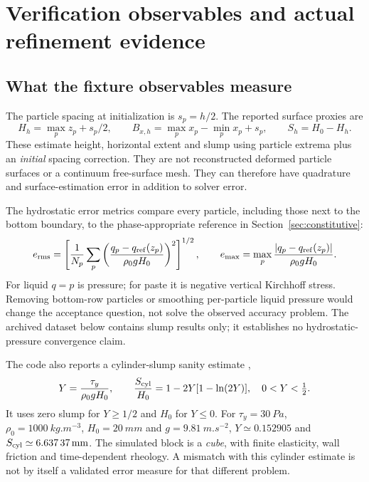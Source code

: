 \section{Verification observables and actual refinement evidence}
\label{sec:verification}
\subsection{What the fixture observables measure}
The particle spacing at initialization is $s_p=h/2$. The reported surface
proxies are
\begin{equation}
 H_h=\max_p z_p+s_p/2,\qquad
 B_{x,h}=\max_p x_p-\min_p x_p+s_p,\qquad S_h=H_0-H_h.
 \label{eq:surface-proxies}
\end{equation}
These estimate height, horizontal extent and slump using particle extrema plus
an \emph{initial} spacing correction. They are not reconstructed deformed
particle surfaces or a continuum free-surface mesh. They can therefore have
quadrature and surface-estimation error in addition to solver error.

The hydrostatic error metrics compare every particle, including those next to
the bottom boundary, to the phase-appropriate reference in
Section~\ref{sec:constitutive}:
\begin{equation}
 e_{\rm rms}=\left[\frac1{N_p}\sum_p
 \left(\frac{q_p-q_{\rm ref}(z_p)}{\rho_0gH_0}\right)^2\right]^{1/2},
 \qquad e_{\max}=\max_p\frac{|q_p-q_{\rm ref}(z_p)|}{\rho_0gH_0}.
\end{equation}
For liquid $q=p$ is pressure; for paste it is negative vertical Kirchhoff stress.
Removing bottom-row particles or smoothing per-particle liquid pressure would
change the acceptance question, not solve the observed accuracy problem.
The archived dataset below contains slump results only; it establishes no
hydrostatic-pressure convergence claim.

The code also reports a cylinder-slump sanity estimate \cite{pashias},
\begin{equation}
 Y=\frac{\tau_y}{\rho_0gH_0},\qquad
 \frac{S_{\rm cyl}}{H_0}=1-2Y[1-\ln(2Y)],\quad 0<Y<\tfrac12.
\end{equation}
It uses zero slump for $Y\geq1/2$ and $H_0$ for $Y\leq0$.
For $\tau_y=\SI{30}{Pa}$, $\rho_0=\SI{1000}{kg.m^{-3}}$,
$H_0=\SI{20}{mm}$ and $g=\SI{9.81}{m.s^{-2}}$, $Y\simeq0.152905$ and
$S_{\rm cyl}\simeq\SI{6.63737}{mm}$. The simulated block is a \emph{cube},
with finite elasticity, wall friction and time-dependent rheology. A mismatch
with this cylinder estimate is not by itself a validated error measure for
that different problem.

